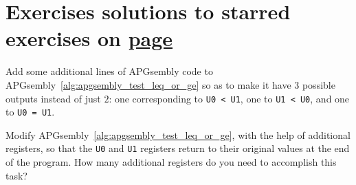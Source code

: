 

\section*{Exercises \hfill \normalfont\textsf{\small solutions to starred exercises on \hyperlink{solutions_universal_computation}{page \pageref{solutions_universal_computation}}}}
\label{sec:solutions_universal_computation}
\vspace*{-0.4cm}\hrulefill\vspace*{-0.3cm}\footnotesize\begin{multicols}{2}\vspace*{-0.4cm}\raggedcolumns{}
	\setlength{\parskip}{0pt}
	
	
	\begin{problem}\label{exer:universal_computation_apgsembly_le_ge_eq} 
		Add some additional lines of APGsembly code to APGsembly~\ref{alg:apgsembly_test_leq_or_ge} so as to make it have $3$ possible outputs instead of just $2$: one corresponding to \texttt{U0 < U1}, one to \texttt{U1 < U0}, and one to \texttt{U0 = U1}.
	\end{problem}
	
	
	\mfilbreak
	
	
	\begin{problem}\label{exer:universal_computation_apgsembly_leq_ge_reset} 
		Modify APGsembly~\ref{alg:apgsembly_test_leq_or_ge}, with the help of additional registers, so that the \texttt{U0} and \texttt{U1} registers return to their original values at the end of the program. How many additional registers do you need to accomplish this task?
	\end{problem}
	
	
	\mfilbreak
	

\end{multicols}
